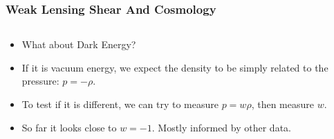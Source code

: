 \documentclass{beamer}
\begin{document}
\frame
{

    \frametitle{Weak Lensing Shear And Cosmology}


    \begin{columns}
        \begin{column}{0.5\textwidth}
            \begin{itemize}

                \item What about Dark Energy?

                \item If it is vacuum energy, we expect the density to
                    be simply related to the pressure: {\color{gold} $p = -\rho$}.

                \item To test if it is different, we can try
                    to measure {\color{gold} $p = w \rho$}, then measure {\color{gold} $w$}.

                \item So far it looks close to {\color{gold} $w = -1$}. Mostly informed
                    by other data.

            \end{itemize}


\end{column}
\end{columns}}
\end{document}

